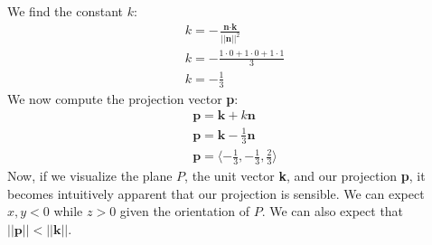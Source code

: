 \documentclass{article}
\begin{document}
\\\\
We find the constant $k$:
\begin{align*}
k = -\frac{\textbf{n} \cdot \textbf{k}}{||\textbf{n}||^2}\\
k = -\frac{1\cdot0 + 1\cdot0 + 1\cdot1}{3}\\
k = -\frac{1}{3}
\end{align*}
We now compute the projection vector \textbf{p}:
\begin{align*}
\textbf{p} = \textbf{k} + k\textbf{n}\\
\textbf{p} = \textbf{k} - \frac{1}{3}\textbf{n}\\
\textbf{p} = \langle -\frac{1}{3},-\frac{1}{3},\frac{2}{3} \rangle
\end{align*}
Now, if we visualize the plane $P$, the unit vector \textbf{k}, and our projection \textbf{p}, it becomes intuitively apparent that our projection
is sensible. We can expect $x,y < 0$ while $z > 0$ given the orientation of $P$. We can also expect that $||\textbf{p}|| < ||\textbf{k}||$.
\end{document}
